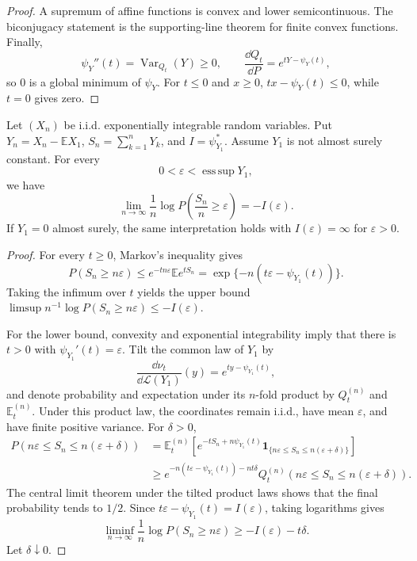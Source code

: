 \begin{proof}
A supremum of affine functions is convex and lower semicontinuous. The
biconjugacy statement is the supporting-line theorem for finite convex
functions. Finally,
\[
\psi_Y''(t)
 =\operatorname{Var}_{Q_t}(Y)\geq0,
\qquad
\frac{\dd Q_t}{\dd P}=e^{tY-\psi_Y(t)},
\]
so $0$ is a global minimum of $\psi_Y$. For $t\leq0$ and $x\geq0$,
$tx-\psi_Y(t)\leq0$, while $t=0$ gives zero.
\end{proof}

\begin{thm}
Let $(X_n)$ be i.i.d. exponentially integrable random variables. Put
$Y_n=X_n-\mathbb EX_1$, $S_n=\sum_{k=1}^{n}Y_k$, and
$I=\psi_{Y_1}^*$. Assume $Y_1$ is not almost surely constant. For every
\[
0<\varepsilon<\operatorname*{ess\,sup}Y_1,
\]
we have
\[
\lim_{n\to\infty}\frac1n\log
P\!\left(\frac{S_n}{n}\geq\varepsilon\right)
 =-I(\varepsilon).
\]
If $Y_1=0$ almost surely, the same interpretation holds with
$I(\varepsilon)=\infty$ for $\varepsilon>0$.
\end{thm}

\begin{proof}
For every $t\geq0$, Markov's inequality gives
\[
P(S_n\geq n\varepsilon)
 \leq e^{-tn\varepsilon}\mathbb E e^{tS_n}
 =\exp\{-n(t\varepsilon-\psi_{Y_1}(t))\}.
\]
Taking the infimum over $t$ yields the upper bound
$\limsup n^{-1}\log P(S_n\geq n\varepsilon)\leq-I(\varepsilon)$.

For the lower bound, convexity and exponential integrability imply that there
is $t>0$ with $\psi_{Y_1}'(t)=\varepsilon$. Tilt the common law of $Y_1$ by
\[
\frac{\dd\nu_t}{\dd\mathcal L(Y_1)}(y)
 =e^{ty-\psi_{Y_1}(t)},
\]
and denote probability and expectation under its $n$-fold product by
$Q_t^{(n)}$ and $\mathbb E_t^{(n)}$. Under this product law, the coordinates
remain i.i.d., have mean $\varepsilon$, and have finite positive variance. For
$\delta>0$,
\begin{align*}
P(n\varepsilon\leq S_n\leq n(\varepsilon+\delta))
&=\mathbb E_t^{(n)}\!\left[
 e^{-tS_n+n\psi_{Y_1}(t)}
 \mathbf1_{\{n\varepsilon\leq S_n\leq n(\varepsilon+\delta)\}}
 \right]\\
&\geq
 e^{-n(t\varepsilon-\psi_{Y_1}(t))-nt\delta}
 Q_t^{(n)}(n\varepsilon\leq S_n\leq n(\varepsilon+\delta)).
\end{align*}
The central limit theorem under the tilted product laws shows that the final
probability tends to $1/2$. Since
$t\varepsilon-\psi_{Y_1}(t)=I(\varepsilon)$, taking logarithms gives
\[
\liminf_{n\to\infty}\frac1n\log P(S_n\geq n\varepsilon)
 \geq-I(\varepsilon)-t\delta.
\]
Let $\delta\downarrow0$.
\end{proof}
